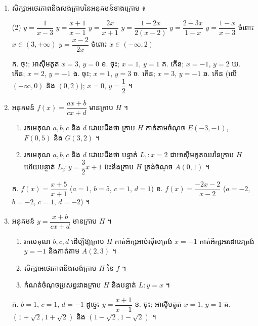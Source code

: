 \begin{enumerate}[1]
\begin{enumerate}[a]
  \end{enumerate}
  \ans
  ក. $\displaystyle\lim_{x \to 0^{\pm}} f(x) = \pm\infty$ និង $\displaystyle\lim_{x \to \pm\infty} f(x) = 2$ \quad ខ. $\displaystyle\lim_{x \to -2^{\pm}} f(x) = \pm\infty$ និង $\displaystyle\lim_{x \to \pm\infty} f(x) = -3$ ។
  \item សិក្សាអថេរភាពនិងសង់ក្រាបនៃអនុគមន៍ខាងក្រោម ៖
  \begin{tasks}(2)
    \task $y = \dfrac{1}{x - 3}$
    \task $y = \dfrac{x + 1}{x - 1}$
    \task $y = \dfrac{2x}{x + 1}$
    \task $y = \dfrac{1 - 2x}{2(x - 2)}$
    \task $y = \dfrac{2 - 3x}{1 - x}$
    \task $y = \dfrac{1 - x}{x - 3}$ ចំពោះ $x \in (3, +\infty)$
    \task $y = \dfrac{x - 2}{2x}$ ចំពោះ $x \in (-\infty, 2)$
  \end{tasks}
  \ans
  ក. ចុះ; អាស៊ីមតូត $x = 3$, $y = 0$ \quad ខ. ចុះ; $x = 1$, $y = 1$ \quad គ. កើន; $x = -1$, $y = 2$ \quad ឃ. កើន; $x = 2$, $y = -1$ \quad ង. ចុះ; $x = 1$, $y = 3$ \quad ច. កើន; $x = 3$, $y = -1$ \quad ឆ. កើន (លើ $(-\infty, 0)$ និង $(0, 2)$); $x = 0$, $y = \dfrac{1}{2}$ ។
  \item អនុគមន៍ $f(x) = \dfrac{ax + b}{cx + d}$ មានក្រាប $H$ ។
  \begin{enumerate}[a]
    \item រកមេគុណ $a, b, c$ និង $d$ ដោយដឹងថា ក្រាប $H$ កាត់តាមចំណុច $E(-3, -1)$, $F(0, 5)$ និង $G(3, 2)$ ។
    \item រកមេគុណ $a, b, c$ និង $d$ ដោយដឹងថា បន្ទាត់ $L_1 : x = 2$ ជាអាស៊ីមតូតឈរនៃក្រាប $H$ ហើយបន្ទាត់ $L_2 : y = \dfrac{3}{2}x + 1$ ប៉ះនឹងក្រាប $H$ ត្រង់ចំណុច $A(0, 1)$ ។
  \end{enumerate}
  \ans
  ក. $f(x) = \dfrac{x + 5}{x + 1}$ ($a = 1$, $b = 5$, $c = 1$, $d = 1$) \quad ខ. $f(x) = \dfrac{-2x - 2}{x - 2}$ ($a = -2$, $b = -2$, $c = 1$, $d = -2$) ។
  \item អនុគមន៍ $y = \dfrac{x + b}{cx + d}$ មានក្រាប $H$ ។
  \begin{enumerate}[a]
    \item រកមេគុណ $b, c, d$ ដើម្បីឱ្យក្រាប $H$ កាត់អ័ក្សអាប់ស៊ីសត្រង់ $x = -1$ កាត់អ័ក្សអរដោនេត្រង់ $y = -1$ និងកាត់តាម $A(2, 3)$ ។
    \item សិក្សាអថេរភាពនិងសង់ក្រាប $H$ នៃ $f$ ។
    \item កំណត់ចំណុចប្រសព្វរវាងក្រាប $H$ និងបន្ទាត់ $L : y = x$ ។
  \end{enumerate}
  \ans
  ក. $b = 1$, $c = 1$, $d = -1$ ដូច្នេះ $y = \dfrac{x + 1}{x - 1}$ \quad ខ. ចុះ; អាស៊ីមតូត $x = 1$, $y = 1$ \quad គ. $(1 + \sqrt{2}, 1 + \sqrt{2})$ និង $(1 - \sqrt{2}, 1 - \sqrt{2})$ ។

\end{enumerate}
